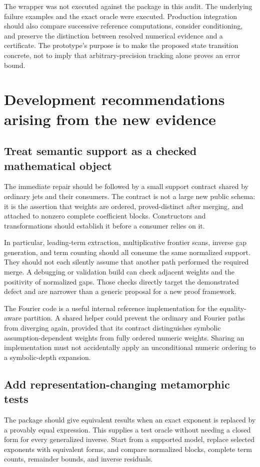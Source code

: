 \documentclass[11pt,letterpaper]{article}
\begin{document}
The wrapper was not executed against the package in this audit. The underlying failure examples and the exact oracle were executed. Production integration should also compare successive reference computations, consider conditioning, and preserve the distinction between resolved numerical evidence and a certificate. The prototype's purpose is to make the proposed state transition concrete, not to imply that arbitrary-precision tracking alone proves an error bound.

\section{Development recommendations arising from the new evidence}
\subsection{Treat semantic support as a checked mathematical object}
The immediate repair should be followed by a small support contract shared by ordinary jets and their consumers. The contract is not a large new public schema: it is the assertion that weights are ordered, proved-distinct after merging, and attached to nonzero complete coefficient blocks. Constructors and transformations should establish it before a consumer relies on it.

In particular, leading-term extraction, multiplicative frontier scans, inverse gap generation, and term counting should all consume the same normalized support. They should not each silently assume that another path performed the required merge. A debugging or validation build can check adjacent weights and the positivity of normalized gaps. Those checks directly target the demonstrated defect and are narrower than a generic proposal for a new proof framework.

The Fourier code is a useful internal reference implementation for the equality-aware partition. A shared helper could prevent the ordinary and Fourier paths from diverging again, provided that its contract distinguishes symbolic assumption-dependent weights from fully ordered numeric weights. Sharing an implementation must not accidentally apply an unconditional numeric ordering to a symbolic-depth expansion.\cite{core,fourier}

\subsection{Add representation-changing metamorphic tests}
The package should give equivalent results when an exact exponent is replaced by a provably equal expression. This supplies a test oracle without needing a closed form for every generalized inverse. Start from a supported model, replace selected exponents with equivalent forms, and compare normalized blocks, complete term counts, remainder bounds, and inverse residuals.
\end{document}
